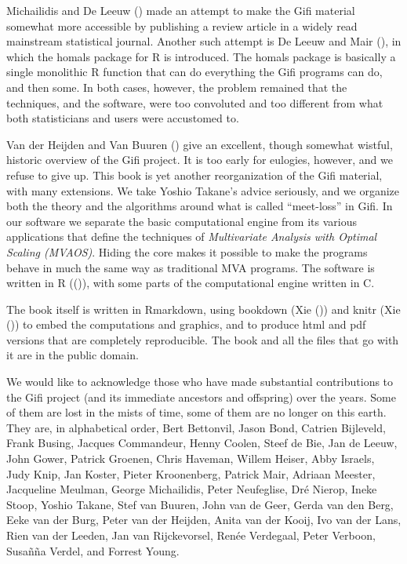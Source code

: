 \documentclass[
  12pt,
]{book}
\begin{document}
Michailidis and De Leeuw () made an attempt to make the Gifi material somewhat more accessible by publishing a review article in a widely read mainstream statistical journal. Another such attempt is De Leeuw and Mair (), in which the homals package for R is introduced. The homals package is basically a single monolithic R function that can do everything the Gifi programs can do, and then some. In both cases, however, the problem remained that the techniques, and the software, were too convoluted and too different from what both statisticians and users were accustomed to.

Van der Heijden and Van Buuren () give an excellent, though somewhat wistful, historic overview of the Gifi project. It is too early for eulogies, however, and we refuse to give up. This book is yet another reorganization of the Gifi material, with many extensions. We take Yoshio Takane's advice seriously, and we organize both the theory and the algorithms around what is called ``meet-loss'' in Gifi. In our software we separate the basic computational engine from its various applications that define the techniques of \emph{Multivariate Analysis with Optimal Scaling (MVAOS)}. Hiding the core makes it possible to make the programs behave in much the same way as traditional MVA programs. The software is written in R (()), with some parts of the computational engine written in C.

The book itself is written in Rmarkdown, using bookdown (Xie ()) and knitr (Xie ()) to embed the computations and graphics, and to produce html and pdf versions that are completely reproducible. The book and all the files that go with it are in the public domain.

We would like to acknowledge those who have made substantial contributions to the Gifi project (and its immediate ancestors and offspring) over the years. Some of them are lost in the mists of time, some of them are no longer on this earth. They are, in alphabetical order, Bert Bettonvil, Jason Bond, Catrien Bijleveld, Frank Busing, Jacques Commandeur, Henny Coolen, Steef de Bie, Jan de Leeuw, John Gower, Patrick Groenen, Chris Haveman, Willem Heiser, Abby Israels, Judy Knip, Jan Koster, Pieter Kroonenberg, Patrick Mair, Adriaan Meester, Jacqueline Meulman, George Michailidis, Peter Neufeglise, Dré Nierop, Ineke Stoop, Yoshio Takane, Stef van Buuren, John van de Geer, Gerda van den Berg, Eeke van der Burg, Peter van der Heijden, Anita van der Kooij, Ivo van der Lans, Rien van der Leeden, Jan van Rijckevorsel, Renée Verdegaal, Peter Verboon, Susañña Verdel, and Forrest Young.
\end{document}
